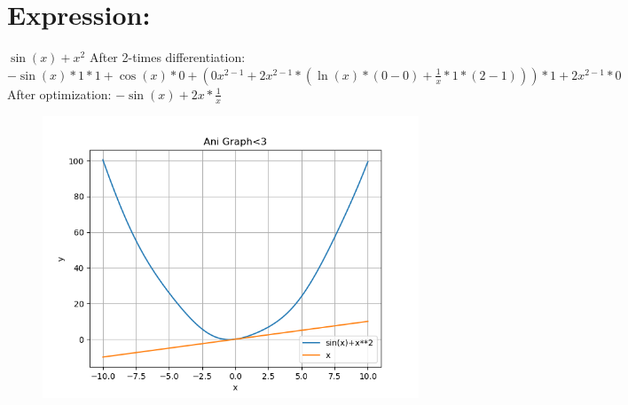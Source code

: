 \documentclass{article}
\begin{document}
\section{Expression:}
$\sin(x)+{x}^{2}$\newline\newline
After 2-times differentiation:\newline
$-\sin(x)*1*1+\cos(x)*0+(0{x}^{2-1}+2{x}^{2-1}*(\ln(x)*(0-0)+\frac{1}{x}*1*(2-1)))*1+2{x}^{2-1}*0$\newline\newline
After optimization:\newline
$-\sin(x)+2x*\frac{1}{x}$\newline\newline
\begin{figure} [!ht]
\begin{flushleft}
\includegraphics[scale = 0.700000]{figs/fig1.png}
\end{flushleft}
\end{figure}
\newpage
\end{document}
